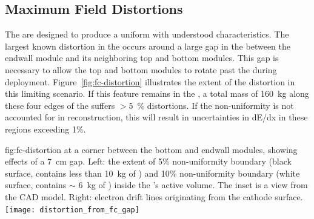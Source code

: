 

\subsection{Maximum Field Distortions}

The  are designed to produce a uniform \efield with understood characteristics.
The largest known \efield distortion in the  occurs around a large gap in the  between the endwall module and its neighboring top and bottom modules. This gap is necessary to allow the top and bottom modules to rotate past the  during deployment.  Figure~\ref{fig:fc-distortion} illustrates the extent of the distortion in this limiting scenario. 
If this feature remains in the , a total \lar mass of \SI{160}{kg} along these four edges of the  suffers $>$\SI{5}{\%} \efield distortions.  If the non-uniformity is not accounted for in reconstruction, this will result in uncertainties in dE/dx in these regions exceeding 1\%. 

\begin{dunefigure}
{fig:fc-distortion}
{\efield at a corner between the bottom and endwall  modules, showing effects of a \SI{7}{cm} gap. Left: the extent of \num{5}\% \efield{} non-uniformity boundary (black surface, contains less than \SI{10}{kg} of \lar) and \num{10}\% non-uniformity boundary (white surface, contains $\sim$ \SI{6}{kg} of \lar) inside the 's active volume. The inset is a view from the CAD model.  Right: electron drift lines originating from the cathode surface.}
\texttt{[image: distortion\_from\_fc\_gap]}
\end{dunefigure}



